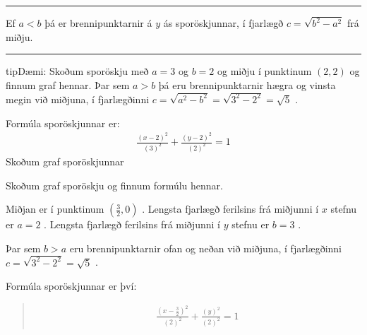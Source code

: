 \documentclass[a4paper,10pt,icelandic]{sphinxmanual}
\begin{document}
\bigskip\hrule\bigskip


Ef \(a<b\) þá er brennipunktarnir á \(y\) \sphinxhyphen{}ás sporöskjunnar, í fjarlægð \(c=\sqrt{b^2-a^2}\) frá miðju.

\begin{figure}[htbp]
\centering

\noindent{}
\end{figure}


\bigskip\hrule\bigskip


\begin{sphinxadmonition}{tip}{Dæmi:}
 Skoðum sporöskju með  \(a=3\) og \(b=2\)  og miðju í punktinum \((2,2)\) og finnum graf hennar.
Þar sem \(a>b\) þá eru brennipunktarnir hægra og vinsta megin við miðjuna, í fjarlægðinni \(c=\sqrt{a^2-b^2}=\sqrt{3^2-2^2}=\sqrt{5}\) .

Formúla sporöskjunnar er:
\begin{equation*}
\begin{split}\frac{(x-2)^2}{(3)^2} + \frac{(y-2)^2}{(2)^2} =1\end{split}
\end{equation*}
Skoðum graf sporöskjunnar


  Skoðum graf sporöskju og finnum formúlu hennar.


Miðjan er í punktinum \((\frac{3}{2},0)\) .
Lengsta fjarlægð ferilsins frá miðjunni í \(x\) \sphinxhyphen{} stefnu er \(a=2\) .
Lengsta fjarlægð ferilsins frá miðjunni í \(y\) \sphinxhyphen{} stefnu er \(b=3\) .

Þar sem \(b>a\) eru brennipunktarnir ofan og neðan við miðjuna, í fjarlægðinni \(c=\sqrt{3^2-2^2}=\sqrt{5}\) .

Formúla sporöskjunnar er því:
\begin{quote}
\begin{equation*}
\begin{split}\frac{(x-\frac{3}{2})^2}{(2)^2} + \frac{(y)^2}{(2)^2} =1\end{split}
\end{equation*}\end{quote}
\end{sphinxadmonition}
\end{document}
